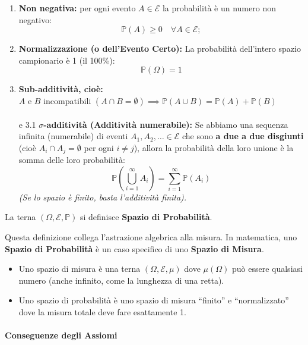\begin{enumerate}
    \item \textbf{Non negativa:} per ogni evento $A \in \mathcal{E}$ la probabilità è un numero non negativo: 
    \[ \mathbb{P}(A) \ge 0 \quad \forall A \in \mathcal{E}; \]
    
    \item \textbf{Normalizzazione (o dell'Evento Certo):} La probabilità dell'intero spazio campionario è 1 (il 100\%):
    \[ \mathbb{P}(\Omega) = 1 \]
    \item \textbf{Sub-additività, cioè:} \\
    $A$ e $B$ incompatibili $(A \cap B = \emptyset) \implies \mathbb{P}(A \cup B) = \mathbb{P}(A) + \mathbb{P}(B)$
    \\\\e 3.1 \textbf{$\sigma$-additività (Additività numerabile):}
    Se abbiamo una sequenza infinita (numerabile) di eventi $A_1, A_2, \dots \in \mathcal{E}$ che sono \textbf{a due a due disgiunti} (cioè $A_i \cap A_j = \emptyset$ per ogni $i \neq j$), allora la probabilità della loro unione è la somma delle loro probabilità:
    \[ \mathbb{P}\left( \bigcup_{i=1}^{\infty} A_i \right) = \sum_{i=1}^{\infty} \mathbb{P}(A_i) \]
    \textit{(Se lo spazio è finito, basta l'additività finita).}
\end{enumerate}

La terna $(\Omega, \mathcal{E}, \mathbb{P})$ si definisce \textbf{Spazio di Probabilità}.

Questa definizione collega l'astrazione algebrica alla misura.
In matematica, uno \textbf{Spazio di Probabilità} è un caso specifico di uno \textbf{Spazio di Misura}.

\begin{itemize}
    \item Uno spazio di misura è una terna $(\Omega, \mathcal{E}, \mu)$ dove $\mu(\Omega)$ può essere qualsiasi numero (anche infinito, come la lunghezza di una retta).
    \item Uno spazio di probabilità è uno spazio di misura ``finito'' e ``normalizzato'' dove la misura totale deve fare esattamente 1.
\end{itemize}

\paragraph{Conseguenze degli Assiomi}

